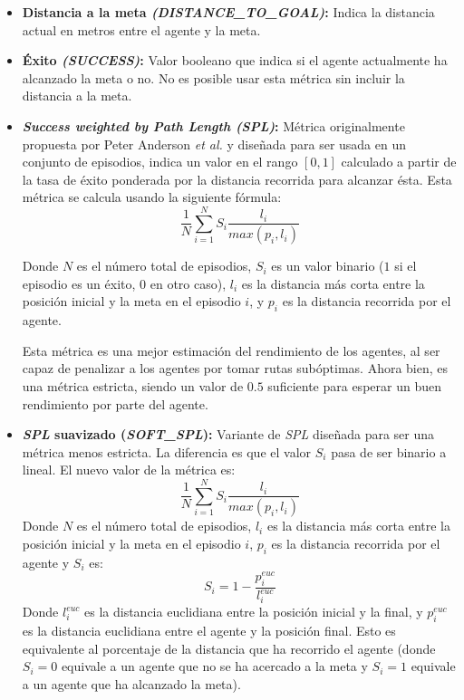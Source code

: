 \begin{itemize}
	\item \textbf{Distancia a la meta \textit{(DISTANCE{\_}TO{\_}GOAL)}:} Indica la distancia actual en metros entre el agente y la meta.
	\item \textbf{Éxito \textit{(SUCCESS)}:} Valor booleano que indica si el agente actualmente ha alcanzado la meta o no. No es posible usar esta métrica sin incluir la distancia a la meta.
	\item \textbf{\textit{Success weighted by Path Length (SPL)}:} Métrica originalmente propuesta por Peter Anderson \textit{et al.} \cite{DBLP:journals/corr/abs-1807-06757} y diseñada para ser usada en un conjunto de episodios, indica un valor en el rango $[0, 1]$ calculado a partir de la tasa de éxito ponderada por la distancia recorrida para alcanzar ésta. Esta métrica se calcula usando la siguiente fórmula:
	\[ \frac{1}{N} \sum^{N}_{i=1} S_{i} \frac{l_i}{max(p_i,l_i)} \]
	
	Donde $N$ es el número total de episodios, $S_i$ es un valor binario ($1$ si el episodio es un éxito, 0 en otro caso), $l_i$ es la distancia más corta entre la posición inicial y la meta en el episodio $i$, y $p_i$ es la distancia recorrida por el agente.
	
	Esta métrica es una mejor estimación del rendimiento de los agentes, al ser capaz de penalizar a los agentes por tomar rutas subóptimas. Ahora bien, es una métrica estricta, siendo un valor de $0.5$ suficiente para esperar un buen rendimiento por parte del agente.
	
	\item \textbf{\textit{SPL} suavizado (\textit{SOFT{\_}SPL}):} Variante de \textit{SPL} diseñada para ser una métrica menos estricta. La diferencia es que el valor $S_i$ pasa de ser binario a lineal. El nuevo valor de la métrica es:
	\[ \frac{1}{N} \sum^{N}_{i=1} S_{i} \frac{l_i}{max(p_i,l_i)} \]
	Donde $N$ es el número total de episodios, $l_i$ es la distancia más corta entre la posición inicial y la meta en el episodio $i$, $p_i$ es la distancia recorrida por el agente y $S_i$ es:
	\[S_i = 1 - \frac{p^{euc}_i}{l^{euc}_i}\]
	Donde $l^{euc}_i$ es la distancia euclidiana entre la posición inicial y la final, y $p^{euc}_i$ es la distancia euclidiana entre el agente y la posición final. Esto es equivalente al porcentaje de la distancia que ha recorrido el agente (donde $S_i = 0$ equivale a un agente que no se ha acercado a la meta y $S_i=1$ equivale a un agente que ha alcanzado la meta).
	

\end{itemize}
